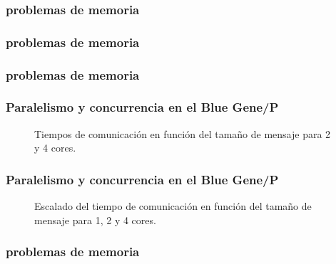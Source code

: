 \documentclass{beamer}
\begin{document}
\begin{frame}
\frametitle{problemas de memoria}

\end{frame}

\begin{frame}
\frametitle{problemas de memoria}

\end{frame}


\begin{frame}
\frametitle{problemas de memoria}

\end{frame}



\begin{frame}
\frametitle{Paralelismo y concurrencia en el Blue Gene/P}
\begin{figure}
\label{fig:qtoctave-secciones}
  \centering
  \caption{Tiempos de comunicación en función del tamaño de mensaje
    para 2 y 4 cores.}
\end{figure}

\end{frame}


\begin{frame}
\frametitle{Paralelismo y concurrencia en el Blue Gene/P}
\begin{figure}
\label{fig:qtoctave-secciones}
  \centering
  \caption{Escalado del tiempo de comunicación en función del tamaño de mensaje
    para 1, 2 y 4 cores.}
\end{figure}

\end{frame}


\begin{frame}
\frametitle{problemas de memoria}
\begin{center}
\end{center}
\end{frame}
\end{document}
